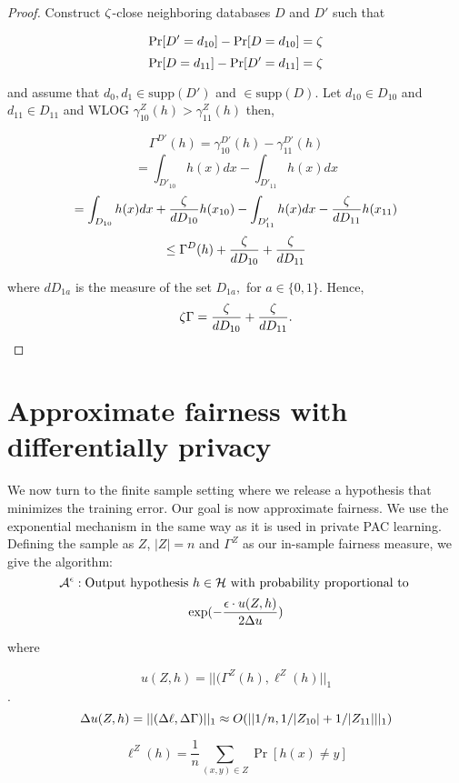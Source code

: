 \begin{proof}
Construct $\zeta$-close neighboring databases $D$ and $D'$ such that

$$\Pr[D'=d_{10}] - \Pr[D=d_{10}] = \zeta$$
$$\Pr[D=d_{11}] - \Pr[D'=d_{11}] = \zeta$$



and assume that $d_0, d_1 \in \text{supp}(D')$ and $\in \text{supp}(D)$. Let $d_{10} \in D_{10}$ and $d_{11} \in D_{11}$ and WLOG $\gamma_{10}^Z(h) > \gamma_{11}^Z(h)$ then,

$$\Gamma^{D'}(h) = \gamma_{10}^{D'}(h) - \gamma_{11}^{D'}(h)$$
$$= \int_{D'_{10}}h(x)dx - \int_{D'_{11}}h(x)dx$$
$$= \int_{D_{10}}h(x)dx + \frac{\zeta}{dD_{10}}h(x_{10}) - \int_{D'_{11}}h(x)dx - \frac{\zeta}{dD_{11}}h(x_{11})$$
$$\leq \Gamma^{D}(h) + \frac{\zeta}{dD_{10}} + \frac{\zeta}{dD_{11}}$$

where $dD_{1a}$ is the measure of the set $D_{1a},$ for $a \in \{0,1\}$. Hence,
$$\zeta\Gamma = \frac{\zeta}{dD_{10}} + \frac{\zeta}{dD_{11}}.$$
\end{proof}


\section{Approximate fairness with differentially privacy}



We now turn to the finite sample setting where we release a hypothesis
that minimizes the training error. Our goal is now approximate
fairness. We use the exponential mechanism in the same way as it is
used in private PAC learning. Defining the sample as $Z$, $|Z| = n$ and
$\Gamma^{Z}$ as our in-sample fairness measure, we give the algorithm:
$$\mathcal{A}^\epsilon : \text{Output hypothesis }h \in \mathcal{H} \text{
with probability proportional to }$$
\begin{align}
\exp(-\frac{\epsilon \cdot u(Z,h)}{2\Delta u})
\end{align}

where

$$u(Z,h) = ||(\Gamma^Z(h), \ell^Z(h)||_{1}$$.
$$\Delta u(Z,h) = ||(\Delta\ell,\Delta{\Gamma})||_1 \approx O(||1/n,1/|Z_{10}|+1/|Z_{11}|||_1)$$

$$\ell^Z(h) = \frac{1}{n} \sum_{(x,y) \in Z}\Pr[h(x) \neq y]$$



